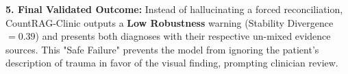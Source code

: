 \textbf{5. Final Validated Outcome:}
Instead of hallucinating a forced reconciliation, CountRAG-Clinic outputs a \textbf{Low Robustness} warning (Stability Divergence $= 0.39$) and presents both diagnoses with their respective un-mixed evidence sources. This "Safe Failure" prevents the model from ignoring the patient's description of trauma in favor of the visual finding, prompting clinician review.

\begin{table}[h]
\caption{Counterfactual Belief Shifts under Modality Conflict}
\label{tab:case_study}
\centering
{}
\end{table}
